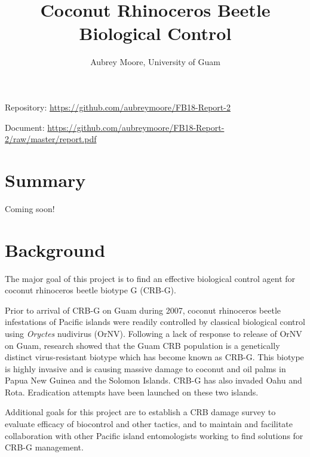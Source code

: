 \documentclass[12pt,letterpaper,english,bibliography=totocnumbered]{scrartcl}
\begin{document}
\titlehead{USDA APHIS Grant AP18PPQFO000C402\\
Progress Report 2\\
Report ID: AP18PPQFO000-PE-SA2-19\\
Performance Period: March 1, 2019 - August 31, 2019}
\title{Coconut Rhinoceros Beetle Biological Control}
\author{Aubrey Moore, University of Guam}
\maketitle

Repository: \url{https://github.com/aubreymoore/FB18-Report-2}

Document: \url{https://github.com/aubreymoore/FB18-Report-2/raw/master/report.pdf}

\newpage
\tableofcontents{}




\newpage
\section{Summary}

Coming soon!




\newpage
\section{Background}

The major goal of this project is to find an effective biological
control agent for coconut rhinoceros beetle biotype G (CRB-G). 

Prior to arrival of CRB-G on Guam during 2007, coconut rhinoceros beetle
infestations of Pacific islands were readily controlled by classical
biological control using \textit{Oryctes} nudivirus (OrNV). Following a lack
of response to release of OrNV on Guam, research showed that the Guam
CRB population is a genetically distinct virus-resistant biotype which
has become known as CRB-G\parencite{marshall_new_2017-1}. This biotype is highly invasive and is
causing massive damage to coconut and oil palms in Papua New Guinea
and the Solomon Islands. CRB-G has also invaded Oahu and Rota. Eradication
attempts have been launched on these two islands. 

Additional goals for this project are to establish a CRB damage survey to evaluate efficacy of biocontrol and other tactics, and to maintain and facilitate collaboration with other Pacific island entomologists working to find solutions for CRB-G management. 
\end{document}
